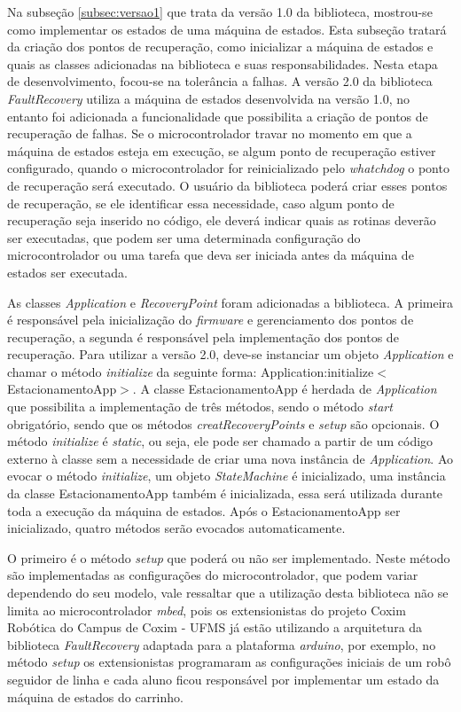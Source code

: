 Na subseção \ref{subsec:versao1} que trata da versão 1.0 da biblioteca, mostrou-se como implementar os estados de uma máquina de estados. Esta subseção tratará da criação dos pontos de recuperação, como inicializar a máquina de estados e quais as classes adicionadas na biblioteca e suas responsabilidades. Nesta etapa de desenvolvimento, focou-se na tolerância a falhas. A versão 2.0 da biblioteca \textit{FaultRecovery} utiliza a máquina de estados desenvolvida na versão 1.0, no entanto foi adicionada a funcionalidade que possibilita a criação de pontos de recuperação de falhas. Se o microcontrolador travar no momento em que a máquina de estados esteja em execução, se algum ponto de recuperação estiver configurado, quando o microcontrolador for reinicializado pelo \textit{whatchdog} o ponto de recuperação será executado. O usuário da biblioteca poderá criar esses pontos de recuperação, se ele identificar essa necessidade, caso algum ponto de recuperação seja inserido no código, ele deverá indicar quais as rotinas deverão ser executadas, que podem ser uma determinada configuração do microcontrolador ou uma tarefa que deva ser iniciada antes da máquina de estados ser executada. 

As classes \textit{Application} e \textit{RecoveryPoint} foram adicionadas a biblioteca. A primeira é responsável pela inicialização do \textit{firmware} e gerenciamento dos pontos de recuperação, a segunda é responsável pela implementação dos pontos de recuperação. Para utilizar a versão 2.0, deve-se instanciar um objeto \textit{Application} e chamar o método \textit{initialize} da seguinte forma: Application:initialize$<$EstacionamentoApp$>$. A classe EstacionamentoApp é herdada de \textit{Application} que possibilita a implementação de três métodos, sendo o método \textit{start} obrigatório, sendo que os métodos \textit{creatRecoveryPoints} e \textit{setup} são opcionais. O método \textit{initialize} é \textit{static}, ou seja, ele pode ser chamado a partir de um código externo à classe sem a necessidade de criar uma nova instância de \textit{Application}. Ao evocar o método \textit{initialize}, um objeto \textit{StateMachine} é inicializado, uma instância da classe EstacionamentoApp também é inicializada, essa será utilizada durante toda a execução da máquina de estados. Após o EstacionamentoApp ser inicializado, quatro métodos serão evocados automaticamente. 

O primeiro é o método \textit{setup} que poderá ou não ser implementado. Neste método são implementadas as configurações do microcontrolador, que podem variar dependendo do seu modelo, vale ressaltar que a utilização desta biblioteca não se limita ao microcontrolador \textit{mbed}, pois os extensionistas do projeto Coxim Robótica do Campus de Coxim - UFMS já estão utilizando a arquitetura da biblioteca \textit{FaultRecovery} adaptada para a plataforma \textit{arduino}, por exemplo, no método \textit{setup} os extensionistas programaram as configurações iniciais de um robô seguidor de linha e cada aluno ficou responsável por implementar um estado da máquina de estados do carrinho.

